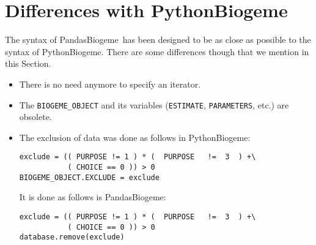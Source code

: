 \documentclass[12pt,a4paper]{article}
\newcommand{\PBIOGEME}{PythonBiogeme}
\newcommand{\PDBIOGEME}{PandasBiogeme}
\begin{document}




\section{Differences with \PBIOGEME}
The syntax of \PDBIOGEME\ has been designed to be as close as possible
to the syntax of \PBIOGEME. There are some differences though that we
mention in this Section.

\begin{itemize}
\item There is no need anymore to specify an iterator.
\item The \lstinline+BIOGEME_OBJECT+ and its variables
  (\lstinline+ESTIMATE+, \lstinline+PARAMETERS+, etc.) are obsolete.
\item The exclusion of data was done as follows in \PBIOGEME:
\begin{lstlisting}[style=nonumbers]
exclude = (( PURPOSE != 1 ) * (  PURPOSE   !=  3  ) +\
           ( CHOICE == 0 )) > 0
BIOGEME_OBJECT.EXCLUDE = exclude
\end{lstlisting}
It is done as follows is \PDBIOGEME:
\begin{lstlisting}[style=nonumbers]
exclude = (( PURPOSE != 1 ) * (  PURPOSE   !=  3  ) +\
           ( CHOICE == 0 )) > 0
database.remove(exclude)
\end{lstlisting}


\end{itemize}
\end{document}
